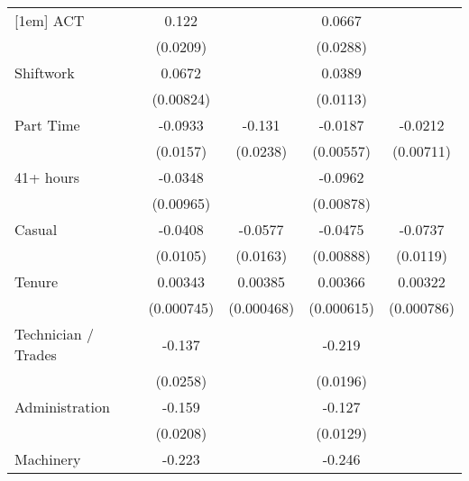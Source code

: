 {\begin{tabular}{l*{4}{c}}
[1em]
ACT                 &       0.122\sym{***}&                     &      0.0667\sym{*}  &                     \\
                    &    (0.0209)         &                     &    (0.0288)         &                     \\
[1em]
Shiftwork           &      0.0672\sym{***}&                     &      0.0389\sym{***}&                     \\
                    &   (0.00824)         &                     &    (0.0113)         &                     \\
[1em]
Part Time           &     -0.0933\sym{***}&      -0.131\sym{***}&     -0.0187\sym{***}&     -0.0212\sym{**} \\
                    &    (0.0157)         &    (0.0238)         &   (0.00557)         &   (0.00711)         \\
[1em]
41+ hours           &     -0.0348\sym{***}&                     &     -0.0962\sym{***}&                     \\
                    &   (0.00965)         &                     &   (0.00878)         &                     \\
[1em]
Casual              &     -0.0408\sym{***}&     -0.0577\sym{***}&     -0.0475\sym{***}&     -0.0737\sym{***}\\
                    &    (0.0105)         &    (0.0163)         &   (0.00888)         &    (0.0119)         \\
[1em]
Tenure              &     0.00343\sym{***}&     0.00385\sym{***}&     0.00366\sym{***}&     0.00322\sym{***}\\
                    &  (0.000745)         &  (0.000468)         &  (0.000615)         &  (0.000786)         \\
[1em]
Technician / Trades &      -0.137\sym{***}&                     &      -0.219\sym{***}&                     \\
                    &    (0.0258)         &                     &    (0.0196)         &                     \\
[1em]
Administration      &      -0.159\sym{***}&                     &      -0.127\sym{***}&                     \\
                    &    (0.0208)         &                     &    (0.0129)         &                     \\
[1em]
Machinery           &      -0.223\sym{***}&                     &      -0.246\sym{***}&                     \\

\end{tabular}}
